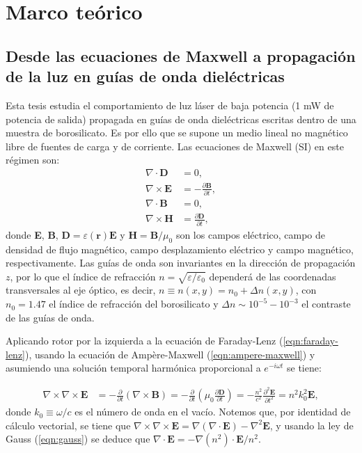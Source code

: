 \chapter{Marco teórico}

\section{Desde las ecuaciones de Maxwell a propagación de la luz en guías de onda dieléctricas}

Esta tesis estudia el comportamiento de luz láser de baja potencia (1 mW de potencia de salida) propagada en guías de onda dieléctricas escritas dentro de una muestra de borosilicato. Es por ello que se supone un medio lineal no magnético libre de fuentes de carga y de corriente. Las ecuaciones de Maxwell (SI) en este régimen son:
\begin{align}
	\nabla\cdot\textbf{D} &= 0, \label{eqn:gauss}
	\\	
	\nabla\times\textbf{E} &= -\frac{\partial \textbf{B}}{\partial t}, \label{eqn:faraday-lenz}
	\\	
	\nabla\cdot\textbf{B} &= 0,
	\\	
	\nabla\times\textbf{H} &= \frac{\partial \textbf{D}}{\partial t}, \label{eqn:ampere-maxwell}
\end{align}
donde \textbf{E}, \textbf{B}, $\textbf{D}=\varepsilon(\textbf{r})\textbf{E}$ y $\textbf{H}=\textbf{B}/\mu_0$ son los campos eléctrico, campo de densidad de flujo magnético, campo desplazamiento eléctrico y campo magnético, respectivamente. Las guías de onda son invariantes en la dirección de propagación $z$, por lo que el índice de refracción $n=\sqrt{\varepsilon/\varepsilon_0}$ dependerá de las coordenadas transversales al eje óptico, es decir, $n \equiv n(x,y) = n_0 + \Delta n(x,y)$, con $n_0=1.47$ el índice de refracción del borosilicato y $\Delta n \sim 10^{-5}-10^{-3}$ el contraste de las guías de onda.

Aplicando rotor por la izquierda a la ecuación de Faraday-Lenz (\ref{eqn:faraday-lenz}), usando la ecuación de Ampère-Maxwell (\ref{eqn:ampere-maxwell}) y asumiendo una solución temporal harmónica proporcional a $e^{-i\omega t}$ se tiene:

\begin{align}
	\nabla\times\nabla\times\textbf{E} &= -\frac{\partial}{\partial t}(\nabla\times\textbf{B}) = -\frac{\partial}{\partial t}\left(\mu_0\frac{\partial \textbf{D}}{\partial t}\right) = -\frac{n^2}{c^2}\frac{\partial^2 \textbf{E}}{\partial t^2} = n^2k_0^2 \textbf{E}, \label{eqn:rotordoble}
\end{align}
donde $k_0 \equiv \omega/c$ es el número de onda en el vacío. Notemos que, por identidad de cálculo vectorial, se tiene que $\nabla\times\nabla\times\textbf{E} = \nabla(\nabla\cdot\textbf{E}) - \nabla^2\textbf{E}$, y usando la ley de Gauss (\ref{eqn:gauss}) se deduce que $\nabla\cdot \textbf{E} = -\nabla(n^2)\cdot\textbf{E}/n^2$.

